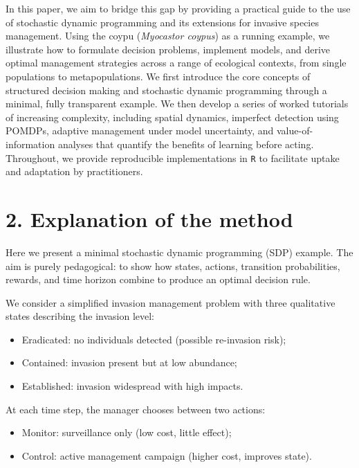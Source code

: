 \documentclass[
  11pt,
  a4paper,
]{article}
\providecommand{\tightlist}{%
  \setlength{\itemsep}{0pt}\setlength{\parskip}{0pt}}
\begin{document}
In this paper, we aim to bridge this gap by providing a practical guide to the use of stochastic dynamic programming and its extensions for invasive species management. Using the coypu (\emph{Myocastor coypus}) as a running example, we illustrate how to formulate decision problems, implement models, and derive optimal management strategies across a range of ecological contexts, from single populations to metapopulations. We first introduce the core concepts of structured decision making and stochastic dynamic programming through a minimal, fully transparent example. We then develop a series of worked tutorials of increasing complexity, including spatial dynamics, imperfect detection using POMDPs, adaptive management under model uncertainty, and value-of-information analyses that quantify the benefits of learning before acting. Throughout, we provide reproducible implementations in \texttt{R} to facilitate uptake and adaptation by practitioners.

\section{2. Explanation of the method}\label{explanation-of-the-method}

Here we present a minimal stochastic dynamic programming (SDP) example. The aim is purely pedagogical: to show how states, actions, transition probabilities, rewards, and time horizon combine to produce an optimal decision rule.

We consider a simplified invasion management problem with three qualitative states describing the invasion level:

\begin{itemize}
\tightlist
\item
  Eradicated: no individuals detected (possible re-invasion risk);
\item
  Contained: invasion present but at low abundance;
\item
  Established: invasion widespread with high impacts.
\end{itemize}

At each time step, the manager chooses between two actions:

\begin{itemize}
\tightlist
\item
  Monitor: surveillance only (low cost, little effect);
\item
  Control: active management campaign (higher cost, improves state).
\end{itemize}
\end{document}
